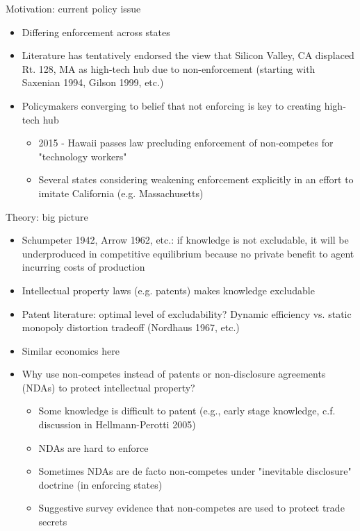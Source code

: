 \documentclass[english,usenames,dvipsnames]{beamer}
\begin{document}
\begin{frame}{Motivation: current policy issue}
\label{Motivation2}
\begin{itemize}
	\item Differing enforcement across states \hyperlink{differing_enforcement}{} 
	
	\item Literature has tentatively endorsed the view that Silicon Valley, CA displaced Rt. 128, MA as high-tech hub due to non-enforcement (starting with Saxenian 1994, Gilson 1999, etc.)
	\item Policymakers converging to belief that not enforcing is key to creating high-tech hub 
	\begin{itemize}
		\item 2015 - Hawaii passes law precluding enforcement of non-competes for "technology workers"
		\item Several states considering weakening enforcement explicitly in an effort to imitate California (e.g. Massachusetts)
	\end{itemize}
\end{itemize}
\end{frame}

\begin{frame}{Theory: big picture}
\label{theory_big_picture}
\begin{itemize}
	\item Schumpeter 1942, Arrow 1962, etc.: if knowledge is not excludable, it will be underproduced in competitive equilibrium because no private benefit to agent incurring costs of production
	\item Intellectual property laws (e.g. patents) makes knowledge excludable
	\item Patent literature: optimal level of excludability? Dynamic efficiency vs. static monopoly distortion tradeoff (Nordhaus 1967, etc.)
	\item Similar economics here
	\item Why use non-competes instead of patents or non-disclosure agreements (NDAs) to protect intellectual property?
	\begin{itemize}
		\item Some knowledge is difficult to patent (e.g., early stage knowledge, c.f. discussion in Hellmann-Perotti 2005)
		\item NDAs are hard to enforce
		\item Sometimes NDAs are de facto non-competes under "inevitable disclosure" doctrine (in enforcing states)
		\item Suggestive survey evidence that non-competes are used to protect trade secrets \hyperlink{incidence_bi}{} 
	\end{itemize}
\end{itemize}
\end{frame}
\end{document}
